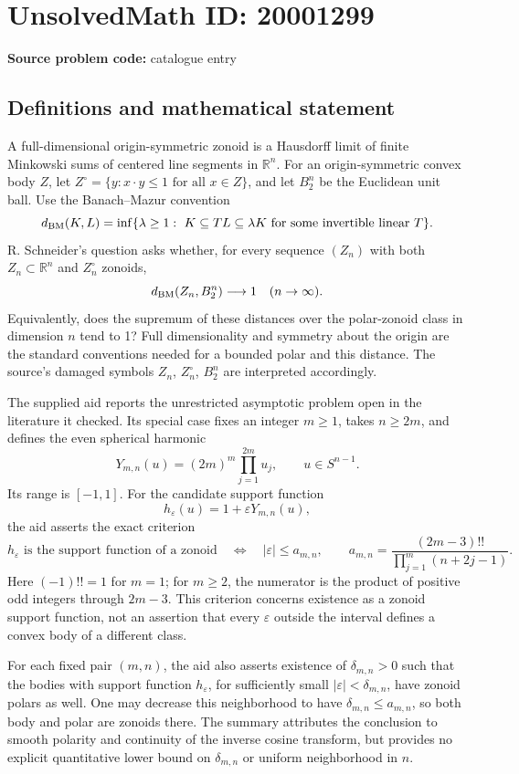 \documentclass[11pt]{article}
\newcommand{\R}{\mathbb{R}}
\begin{document}
\section*{UnsolvedMath ID: 20001299}
\textbf{Source problem code:} catalogue entry
\subsection{Definitions and mathematical statement}
A full-dimensional origin-symmetric zonoid is a Hausdorff limit of finite Minkowski sums of centered line segments in \(\R^n\). For an origin-symmetric convex body \(Z\), let \(Z^\circ=\{y:x\cdot y\le1\text{ for all }x\in Z\}\), and let \(B_2^n\) be the Euclidean unit ball. Use the Banach--Mazur convention
\[
d_{\rm BM}(K,L)=\inf\{\lambda\ge1:\ K\subseteq TL\subseteq\lambda K\text{ for some invertible linear }T\}.
\]
R. Schneider's question asks whether, for every sequence \((Z_n)\) with both \(Z_n\subset\R^n\) and \(Z_n^\circ\) zonoids,
\[
d_{\rm BM}(Z_n,B_2^n)\longrightarrow1\quad(n\to\infty).
\]
Equivalently, does the supremum of these distances over the polar-zonoid class in dimension \(n\) tend to 1? Full dimensionality and symmetry about the origin are the standard conventions needed for a bounded polar and this distance. The source's damaged symbols \(Z_n\), \(Z_n^\circ\), \(B_2^n\) are interpreted accordingly.

The supplied aid reports the unrestricted asymptotic problem open in the literature it checked. Its special case fixes an integer \(m\ge1\), takes \(n\ge2m\), and defines the even spherical harmonic
\[
Y_{m,n}(u)=(2m)^m\prod_{j=1}^{2m}u_j,\qquad u\in S^{n-1}.
\]
Its range is \([-1,1]\). For the candidate support function
\[
h_\varepsilon(u)=1+\varepsilon Y_{m,n}(u),
\]
the aid asserts the exact criterion
\[
h_\varepsilon\text{ is the support function of a zonoid}
\quad\Longleftrightarrow\quad
|\varepsilon|\le a_{m,n},\qquad
a_{m,n}=\frac{(2m-3)!!}{\prod_{j=1}^m(n+2j-1)}.
\]
Here \((-1)!!=1\) for \(m=1\); for \(m\ge2\), the numerator is the product of positive odd integers through \(2m-3\). This criterion concerns existence as a zonoid support function, not an assertion that every \(\varepsilon\) outside the interval defines a convex body of a different class.

For each fixed pair \((m,n)\), the aid also asserts existence of \(\delta_{m,n}>0\) such that the bodies with support function \(h_\varepsilon\), for sufficiently small \(|\varepsilon|<\delta_{m,n}\), have zonoid polars as well. One may decrease this neighborhood to have \(\delta_{m,n}\le a_{m,n}\), so both body and polar are zonoids there. The summary attributes the conclusion to smooth polarity and continuity of the inverse cosine transform, but provides no explicit quantitative lower bound on \(\delta_{m,n}\) or uniform neighborhood in \(n\).
\end{document}
